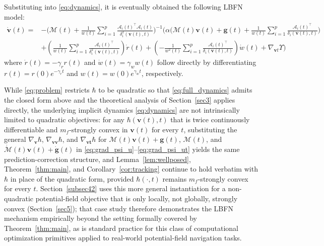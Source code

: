 \documentclass[pdflatex,sn-mathphys,Numbered]{sn-jnl}
\theoremstyle{thmstyleone}
\theoremstyle{thmstyletwo}
\theoremstyle{thmstylethree}
\begin{document}
Substituting into \eqref{eq:dynamics}, it is eventually obtained the following LBFN model:
\begin{equation}
\begin{aligned}
\dot{\bm{v}}(t)=  &-\bigg( \mathcal{M}(t) + \frac{1}{w(t)} \sum_{i=1}^{p} \frac{\mathcal{A}_i(t)^\top \mathcal{A}_i(t)}{\delta_i^2(\bm{v}(t), t)} \bigg)^{-1} \bigg( \alpha \bigg( \mathcal{M}(t) \bm{v}(t)+ \bm{g}(t)+ \frac{1}{w(t)} \sum_{i=1}^{p} \frac{\mathcal{A}_i(t)^\top}{\delta_i(\bm{v}(t), t)} \bigg) \\
&+ \left( \frac{1}{w(t)} \sum_{i=1}^{p} \frac{\mathcal{A}_i(t)^\top}{\delta_i^2(\bm{v}(t), t)} \right) \dot{r}(t)+ \left( -\frac{1}{w^2(t)} \sum_{i=1}^{p} \frac{\mathcal{A}_i(t)^\top}{\delta_i(\bm{v}(t), t)} \right) \dot{w}(t) + \nabla_{\bm{v} t} \Upsilon \bigg)
\end{aligned}
\label{eq:full_dynamics}
\end{equation}
where $\dot{r}(t)=-\gamma_r r(t)$ and $\dot{w}(t)=\gamma_w w(t)$ follow directly by differentiating $r(t)=r(0)e^{-\gamma_r t}$ and $w(t)=w(0)e^{\gamma_w t}$, respectively.

While \eqref{eq:problem} restricts $\hbar$ to be quadratic so that \eqref{eq:full_dynamics} admits the closed form above and the theoretical analysis of Section~\ref{sec3} applies directly, the underlying implicit dynamics \eqref{eq:dynamics} are not intrinsically limited to quadratic objectives: for any $\hbar(\bm{v}(t),t)$ that is twice continuously differentiable and $m_f$-strongly convex in $\bm{v}(t)$ for every $t$, substituting the general $\nabla_{\bm{v}}\hbar$, $\nabla_{\bm{vv}}\hbar$, and $\nabla_{\bm{vt}}\hbar$ for $\mathcal{M}(t)\bm{v}(t)+\bm{g}(t)$, $\mathcal{M}(t)$, and $\dot{\mathcal{M}}(t)\bm{v}(t)+\dot{\bm{g}}(t)$ in \eqref{eq:grad_psi_u}--\eqref{eq:grad_psi_ut} yields the same prediction-correction structure, and Lemma~\ref{lem:wellposed}, Theorem~\ref{thm:main}, and Corollary~\ref{cor:tracking} continue to hold verbatim with $\hbar$ in place of the quadratic form, provided $\hbar(\cdot,t)$ remains $m_f$-strongly convex for every $t$. Section~\ref{subsec42} uses this more general instantiation for a non-quadratic potential-field objective that is only locally, not globally, strongly convex (Section~\ref{sec5}); that case study therefore demonstrates the LBFN mechanism empirically beyond the setting formally covered by Theorem~\ref{thm:main}, as is standard practice for this class of computational optimization primitives applied to real-world potential-field navigation tasks.
\end{document}
